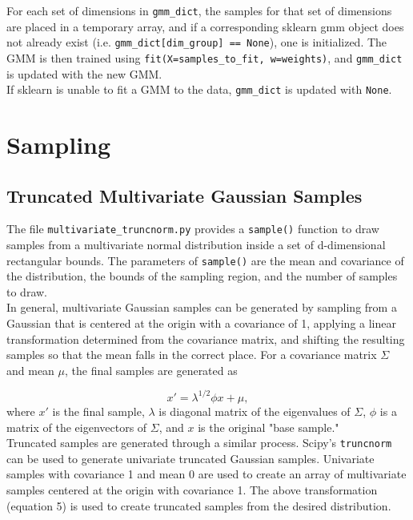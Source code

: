 \documentclass{article}
\begin{document}
For each set of dimensions in \texttt{gmm\_dict}, the samples for that set of
dimensions are placed in a temporary array, and if a corresponding sklearn gmm
object does not already exist (i.e. \texttt{gmm\_dict[dim\_group] == None}), one
is initialized. The GMM is then trained using
\texttt{fit(X=samples\_to\_fit, w=weights)}, and \texttt{gmm\_dict} is updated
with the new GMM. \\

If sklearn is unable to fit a GMM to the data, \texttt{gmm\_dict} is updated
with \texttt{None}.

\section{Sampling}

\subsection{Truncated Multivariate Gaussian Samples}

The file \texttt{multivariate\_truncnorm.py} provides a \texttt{sample()}
function to draw samples from a multivariate normal distribution inside a set of
d-dimensional rectangular bounds. The parameters of \texttt{sample()} are the
mean and covariance of the distribution, the bounds of the sampling region, and
the number of samples to draw. \\

In general, multivariate Gaussian samples can be generated by sampling from a
Gaussian that is centered at the origin with a covariance of 1, applying a
linear transformation determined from the covariance matrix, and shifting the
resulting samples so that the mean falls in the correct place. For a covariance
matrix $\Sigma$ and mean $\mu$, the final samples are generated as

\begin{equation}
    x' = \lambda^{1/2} \phi x + \mu,
\end{equation}
where $x'$ is the final sample, $\lambda$ is diagonal matrix of the eigenvalues
of $\Sigma$, $\phi$ is a matrix of the eigenvectors of $\Sigma$, and $x$ is the
original "base sample." \\

Truncated samples are generated through a similar process. Scipy's
\texttt{truncnorm} can be used to generate univariate truncated Gaussian
samples. Univariate samples with covariance 1 and mean 0 are used to create an
array of multivariate samples centered at the origin with covariance 1. The
above transformation (equation 5) is used to create truncated samples from the
desired distribution. \\
\end{document}
